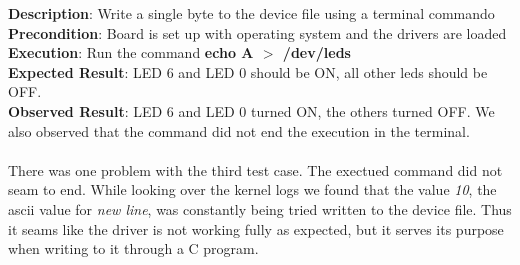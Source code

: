 {\bf Description}: Write a single byte to the device file using a terminal commando\\
{\bf Precondition}: Board is set up with operating system and the drivers are loaded\\
{\bf Execution}: Run the command {\bf echo A $>$ /dev/leds} \\
{\bf Expected Result}: LED 6 and LED 0 should be ON, all other leds should be OFF.\\
{\bf Observed Result}: LED 6 and LED 0 turned ON, the others turned OFF. We also
observed that the command did not end the execution in the terminal.\\
 \\
There was one problem with the third test case. The exectued command did not seam to end.
While looking over the kernel logs we found that the value {\it 10}, the ascii value for
{\it new line}, was constantly being tried written to the device file. Thus it seams like
the driver is not working fully as expected, but it serves its purpose when writing to it
through a C program.
